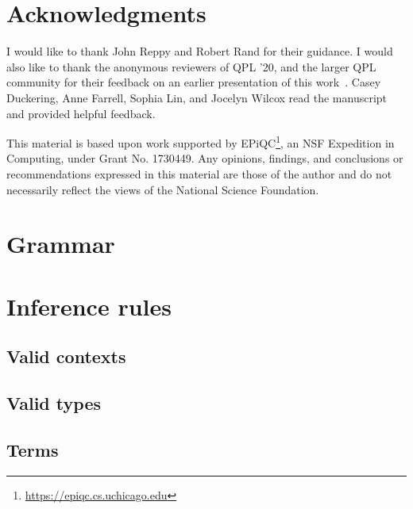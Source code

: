 \documentclass[adraft,creativecommons]{eptcs}
\theoremstyle{definition}
\theoremstyle{remark}
\begin{document}
\section*{Acknowledgments}
I would like to thank John Reppy and Robert Rand for their guidance. I would also like to thank the anonymous reviewers of QPL '20, and the larger QPL community for their feedback on an earlier presentation of this work~\parencite{qhtt20}. Casey Duckering, Anne Farrell, Sophia Lin, and Jocelyn Wilcox read the manuscript and provided helpful feedback.

This material is based upon work supported by EPiQC\footnote{\url{https://epiqc.cs.uchicago.edu}}, an NSF Expedition in Computing, under Grant No. 1730449. Any opinions, findings, and conclusions or recommendations expressed in this material are those
of the author and do not necessarily reflect the views of the National Science Foundation.

\printbibliography[heading=bibintoc]

\appendix

\section{Grammar}
\label{app:grammar}


\section{Inference rules}
\label{app:rules}

\subsection{Valid contexts}


\subsection{Valid types}


\subsection{Terms}
\end{document}
